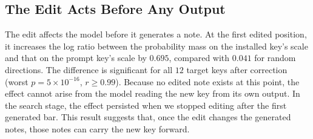 \documentclass{article}
\begin{document}
\subsection{The Edit Acts Before Any Output}
\label{sec:nextpitch}
The edit affects the model before it generates a note.
At the first edited position, it increases the log ratio between the probability mass on the installed key's scale and that on the prompt key's scale by $0.695$, compared with $0.041$ for random directions.
The difference is significant for all $12$ target keys after correction (worst $p=5\times10^{-16}$, $r\ge0.99$).
Because no edited note exists at this point, the effect cannot arise from the model reading the new key from its own output.
In the search stage, the effect persisted when we stopped editing after the first generated bar.
This result suggests that, once the edit changes the generated notes, those notes can carry the new key forward.
\end{document}
